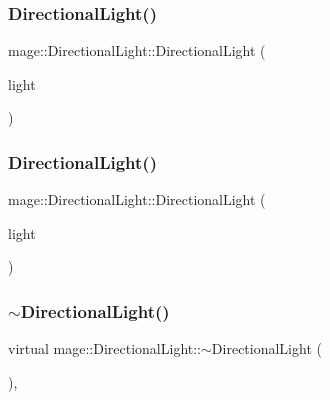 \subsubsection{\texorpdfstring{Directional\+Light()}{DirectionalLight()}\hspace{0.1cm}{\footnotesize\ttfamily [2/3]}}
{\footnotesize\ttfamily mage\+::\+Directional\+Light\+::\+Directional\+Light (\begin{DoxyParamCaption}\item[{const \hyperlink{classmage_1_1_directional_light}{Directional\+Light} \&}]{light }\end{DoxyParamCaption})\hspace{0.3cm}{\ttfamily [default]}}

\hypertarget{classmage_1_1_directional_light_a61dfbcff7faae4ec2f24b9d4f30c7720}{}\label{classmage_1_1_directional_light_a61dfbcff7faae4ec2f24b9d4f30c7720} 
\subsubsection{\texorpdfstring{Directional\+Light()}{DirectionalLight()}\hspace{0.1cm}{\footnotesize\ttfamily [3/3]}}
{\footnotesize\ttfamily mage\+::\+Directional\+Light\+::\+Directional\+Light (\begin{DoxyParamCaption}\item[{\hyperlink{classmage_1_1_directional_light}{Directional\+Light} \&\&}]{light }\end{DoxyParamCaption})\hspace{0.3cm}{\ttfamily [default]}}

\hypertarget{classmage_1_1_directional_light_a08f8d1a4b38d18aa4735ddda7d6e0f51}{}\label{classmage_1_1_directional_light_a08f8d1a4b38d18aa4735ddda7d6e0f51} 
\subsubsection{\texorpdfstring{$\sim$\+Directional\+Light()}{~DirectionalLight()}}
{\footnotesize\ttfamily virtual mage\+::\+Directional\+Light\+::$\sim$\+Directional\+Light (\begin{DoxyParamCaption}{ }\end{DoxyParamCaption})\hspace{0.3cm}{\ttfamily [virtual]}, {\ttfamily [default]}}



